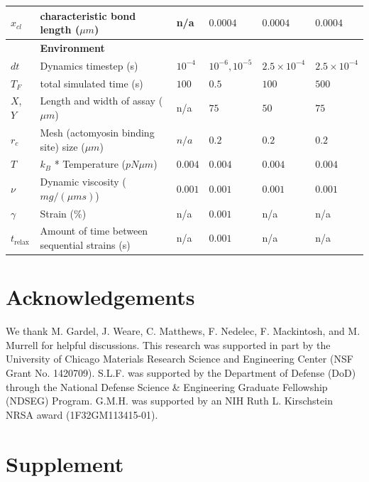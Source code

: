 \documentclass[11pt]{article}
\newcommand{\beginsupplement}{%
  \setcounter{table}{0}
  \renewcommand{\thetable}{S\arabic{table}}%
  \setcounter{figure}{0}
  \renewcommand{\thefigure}{S\arabic{figure}}%
}
\begin{document}
\begin{table}
\begin{tabular}{|C{1cm}|L{6cm}|C{2cm}|C{2cm}|C{2cm}|C{2cm}|}
    $x_{cl}$& characteristic bond length ($\mu m$) & n/a & $0.0004$ & $0.0004$ & $0.0004$ \\
    \hline
    &\bf{Environment} & & \\
    \hline
    $dt$ & Dynamics timestep (s) & $10^{-4}$ & $10^{-6},10^{-5}$ &$2.5\times10^{-4}$ &$2.5\times10^{-4}$ \\
    $T_F$& total simulated time (s) & $100$ & $0.5$ & $100$ & $500$ \\
    $X$, $Y$ & Length and width of assay ($\mu m$)& n/a & $75$ & $50$ & $75$\\
    $r_c$ & Mesh (actomyosin binding site) size ($\mu m$) & $n/a$ & $0.2 $ & $0.2 $& $0.2 $ \\ 
    $T$ & $k_B$ * Temperature ($pN\mu m$)& $0.004$ & $0.004$& $0.004$& $0.004$\\
    $\nu$ & Dynamic viscosity ($mg/(\mu m s)$) & $0.001$& $0.001$& $0.001$& $0.001$\\
    $\gamma$ & Strain (\%) \cite{stricker2010}& n/a& $0.001$&n/a&n/a\\
    $t_\text{relax}$ & Amount of time between sequential strains (s)& n/a& $0.001$ &n/a&n/a\\
    \hline
  \end{tabular}
  \label{tab:params}
\end{table}



\section*{Acknowledgements}  
We thank M. Gardel, J. Weare, C. Matthews, F. Nedelec, F. Mackintosh, and M. Murrell for helpful discussions. This research was supported in part by the University of Chicago Materials Research Science and Engineering Center (NSF Grant No. 1420709). S.L.F. was supported by the Department of Defense (DoD) through the National Defense Science \& Engineering Graduate Fellowship (NDSEG) Program. G.M.H. was supported by an NIH Ruth L. Kirschstein NRSA award (1F32GM113415-01).



\beginsupplement
\section{Supplement}
\end{document}
